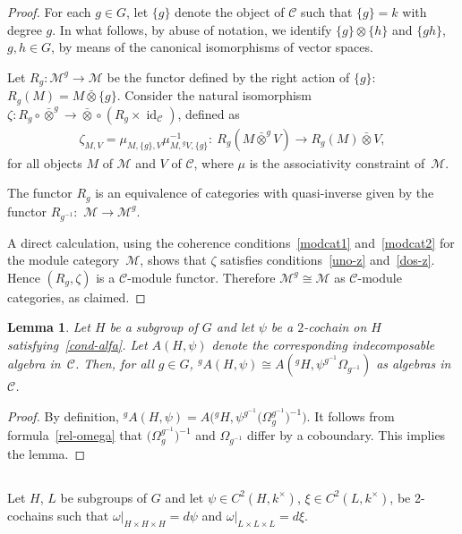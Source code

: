 \documentclass[pdftex]{sigma}
\numberwithin{equation}{section}
\newtheorem{Lemma}[Theorem]{Lemma}
 { \theoremstyle{definition}
\newtheorem{Example}[Theorem]{Example}
\newtheorem{Remark}[Theorem]{Remark} }
\newcommand{\cch}{\Omega}
\newcommand{\oot}{\bar\otimes}
\newcommand{\C}{{\mathcal C}}
\newcommand{\M}{{\mathcal M}}
\newcommand{\1}{\textbf{1}}
\newcommand\id{\operatorname{id}}
\begin{document}
\begin{proof} For each $g \in G$, let $\{g\}$ denote the object of $\C$ such that $\{g\} = k$ with degree $g$. In what follows, by abuse of notation, we identify $\{g\} \otimes \{h\}$ and $\{gh\}$, $g, h \in G$, by means of the canonical isomorphisms of vector spaces.

Let $R_g\colon \M^g \to \M$ be the functor def\/ined by the right action of $\{g\}$: $R_g(M) = M \oot \{g\}$. Consider the natural isomorphism $\zeta\colon R_g \circ \oot^g \to \oot \circ (R_g \times \id_\C)$, def\/ined as
\begin{gather*}\zeta_{M, V} = \mu_{M, \{g\}, V} \mu^{-1}_{M, {}^g V, \{g\}}\colon \ R_g(M\oot^g V) \to R_g(M) \oot V,
\end{gather*} for all objects $M$ of $\M$ and $V$ of $\C$, where $\mu$ is the associativity constraint of~$\M$.

The functor $R_g$ is an equivalence of categories with quasi-inverse given by the functor $R_{g^{-1}}\colon$ $\M \to \M^g$.

A direct calculation, using the coherence conditions~\eqref{modcat1} and~\eqref{modcat2} for the module category~$\M$, shows that $\zeta$ satisf\/ies conditions~\eqref{uno-z} and~\eqref{dos-z}. Hence $(R_g, \zeta)$ is a $\C$-module functor. Therefore $\M^g \cong \M$ as $\C$-module categories, as claimed. \end{proof}

\begin{Lemma}\label{gdea} Let $H$ be a subgroup of $G$ and let $\psi$ be a $2$-cochain on $H$ satisfying~\eqref{cond-alfa}. Let $A(H, \psi)$ denote the corresponding indecomposable algebra in~$\C$. Then, for all $g \in G$, ${}^gA(H, \psi) \cong A({}^gH, \psi^{g^{-1}} \cch_{g^{-1}})$ as algebras in~$\C$.
\end{Lemma}

\begin{proof} By def\/inition, ${}^gA(H, \psi) = A\big({}^gH, \psi^{g^{-1}} \big(\cch_{g}^{g^{-1}}\big)^{-1}\big)$. It follows from formula~\eqref{rel-omega} that $\big(\cch_{g}^{g^{-1}}\big)^{-1}$ and $\cch_{g^{-1}}$ dif\/fer by a coboundary. This implies the lemma. \end{proof}

\subsection{} Let $H$, $L$ be subgroups of $G$ and let $\psi \in C^2(H, k^\times)$, $\xi \in C^2(L, k^\times)$, be 2-cochains such that $\omega\vert_{H \times H \times H} = d\psi$ and $\omega\vert_{L \times L \times L} = d\xi$.
\end{document}
